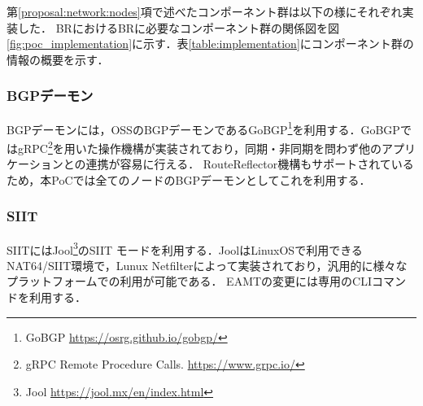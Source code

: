 \begin{table}[h]
    \label{table:implementation}
    \caption{PoCの実装に利用したソフトウェア群}
\end{table}

第\ref{proposal:network:nodes}項で述べたコンポーネント群は以下の様にそれぞれ実装した．
BRにおけるBRに必要なコンポーネント群の関係図を図\ref{fig:poc_implementation}に示す．表\ref{table:implementation}にコンポーネント群の情報の概要を示す．


\subsubsection{BGPデーモン}
BGPデーモンには，OSSのBGPデーモンであるGoBGP\footnote{GoBGP \url{https://osrg.github.io/gobgp/}}を利用する．GoBGPではgRPC\footnote{gRPC Remote Procedure Calls. \url{https://www.grpc.io/}}を用いた操作機構が実装されており，同期・非同期を問わず他のアプリケーションとの連携が容易に行える．
RouteReflector機構もサポートされているため，本PoCでは全てのノードのBGPデーモンとしてこれを利用する．

\subsubsection{SIIT}
SIITにはJool\footnote{Jool  \url{https://jool.mx/en/index.html}}のSIIT モードを利用する．JoolはLinuxOSで利用できるNAT64/SIIT環境で，Lunux Netfilterによって実装されており，汎用的に様々なプラットフォームでの利用が可能である\cite{Jool,quintero2016performance}．
EAMTの変更には専用のCLIコマンドを利用する．

